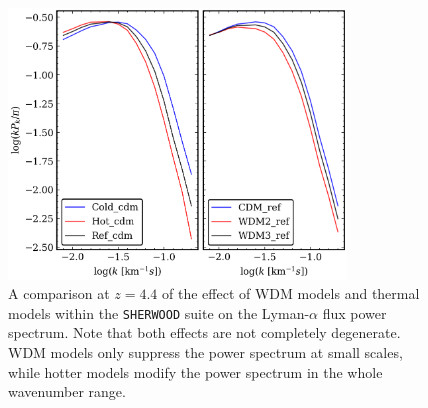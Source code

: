 \begin{figure}[ht]
        \centering
            \includegraphics[width=0.8\textwidth]{img/ML/PS_thermal_vs_wdm.png}
            \caption{A comparison at $z=4.4$ of the effect of WDM models and thermal models within the \texttt{SHERWOOD} suite on the Lyman-$\alpha$ flux power spectrum. Note that both effects are not completely degenerate. WDM models only suppress the power spectrum at small scales, while hotter models modify the power spectrum in the whole wavenumber range.}
            \label{fig: PS thermal vs WDM}
\end{figure}   




